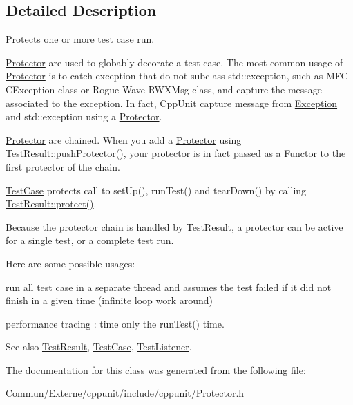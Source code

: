 \subsection{Detailed Description}
Protects one or more test case run. 

\hyperlink{class_protector}{Protector} are used to globably \textquotesingle{}decorate\textquotesingle{} a test case. The most common usage of \hyperlink{class_protector}{Protector} is to catch exception that do not subclass std\+::exception, such as M\+FC C\+Exception class or Rogue Wave R\+W\+X\+Msg class, and capture the message associated to the exception. In fact, Cpp\+Unit capture message from \hyperlink{class_exception}{Exception} and std\+::exception using a \hyperlink{class_protector}{Protector}.

\hyperlink{class_protector}{Protector} are chained. When you add a \hyperlink{class_protector}{Protector} using \hyperlink{class_test_result_a1a4fbbca38cb73e8e00905193b7593dc}{Test\+Result\+::push\+Protector()}, your protector is in fact passed as a \hyperlink{class_functor}{Functor} to the first protector of the chain.

\hyperlink{class_test_case}{Test\+Case} protects call to set\+Up(), run\+Test() and tear\+Down() by calling \hyperlink{class_test_result_a243b3097a3d9468abc61e7910bbaa8b7}{Test\+Result\+::protect()}.

Because the protector chain is handled by \hyperlink{class_test_result}{Test\+Result}, a protector can be active for a single test, or a complete test run.

Here are some possible usages\+:
\begin{DoxyItemize}
\item run all test case in a separate thread and assumes the test failed if it did not finish in a given time (infinite loop work around)
\item performance tracing \+: time only the run\+Test() time. \begin{DoxySeeAlso}{See also}
\hyperlink{class_test_result}{Test\+Result}, \hyperlink{class_test_case}{Test\+Case}, \hyperlink{class_test_listener}{Test\+Listener}. 
\end{DoxySeeAlso}

\end{DoxyItemize}

The documentation for this class was generated from the following file\+:\begin{DoxyCompactItemize}
\item 
Commun/\+Externe/cppunit/include/cppunit/Protector.\+h\end{DoxyCompactItemize}
